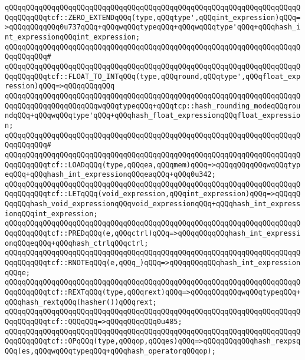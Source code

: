 \verb|qQQqqQQqqQQqqQQqqQQqqQQqqQQqqQQqqQQqqQQqqQQqqQQqqQQqqQQqqQQqqQQqqQQqqQQqqQQqqQQqtcf::ZERO_EXTENDqQQq(type,qQQqtype',qQQqint_expression)qQQq=>qQQqqQQqqQQq0u737qQQq+qQQqwqQQqtypeqQQq+qQQqwqQQqtype'qQQq+qQQqhash_int_expressionqQQqint_expression;|\newline
\verb|qQQqqQQqqQQqqQQqqQQqqQQqqQQqqQQqqQQqqQQqqQQqqQQqqQQqqQQqqQQqqQQqqQQqqQQqqQQqqQQq#|\newline
\verb|qQQqqQQqqQQqqQQqqQQqqQQqqQQqqQQqqQQqqQQqqQQqqQQqqQQqqQQqqQQqqQQqqQQqqQQqqQQqqQQqtcf::FLOAT_TO_INTqQQq(type,qQQqround,qQQqtype',qQQqfloat_expression)qQQq=>qQQqqQQqqQQq|\newline
\verb|qQQqqQQqqQQqqQQqqQQqqQQqqQQqqQQqqQQqqQQqqQQqqQQqqQQqqQQqqQQqqQQqqQQqqQQqqQQqqQQqqQQqqQQqqQQqwqQQqtypeqQQq+qQQqtcp::hash_rounding_modeqQQqroundqQQq+qQQqwqQQqtype'qQQq+qQQqhash_float_expressionqQQqfloat_expression;|\newline
\verb|qQQqqQQqqQQqqQQqqQQqqQQqqQQqqQQqqQQqqQQqqQQqqQQqqQQqqQQqqQQqqQQqqQQqqQQqqQQqqQQq#|\newline
\verb|qQQqqQQqqQQqqQQqqQQqqQQqqQQqqQQqqQQqqQQqqQQqqQQqqQQqqQQqqQQqqQQqqQQqqQQqqQQqqQQqtcf::LOADqQQq(type,qQQqea,qQQqmem)qQQq=>qQQqqQQqqQQqwqQQqtypeqQQq+qQQqhash_int_expressionqQQqeaqQQq+qQQq0u342;|\newline
\verb|qQQqqQQqqQQqqQQqqQQqqQQqqQQqqQQqqQQqqQQqqQQqqQQqqQQqqQQqqQQqqQQqqQQqqQQqqQQqqQQqtcf::LETqQQq(void_expression,qQQqint_expression)qQQq=>qQQqqQQqqQQqhash_void_expressionqQQqvoid_expressionqQQq+qQQqhash_int_expressionqQQqint_expression;|\newline
\verb|qQQqqQQqqQQqqQQqqQQqqQQqqQQqqQQqqQQqqQQqqQQqqQQqqQQqqQQqqQQqqQQqqQQqqQQqqQQqqQQqtcf::PREDqQQq(e,qQQqctrl)qQQq=>qQQqqQQqqQQqhash_int_expressionqQQqeqQQq+qQQqhash_ctrlqQQqctrl;|\newline
\verb|qQQqqQQqqQQqqQQqqQQqqQQqqQQqqQQqqQQqqQQqqQQqqQQqqQQqqQQqqQQqqQQqqQQqqQQqqQQqqQQqtcf::RNOTEqQQq(e,qQQq_)qQQq=>qQQqqQQqqQQqhash_int_expressionqQQqe;|\newline
\verb|qQQqqQQqqQQqqQQqqQQqqQQqqQQqqQQqqQQqqQQqqQQqqQQqqQQqqQQqqQQqqQQqqQQqqQQqqQQqqQQqtcf::REXTqQQq(type,qQQqrext)qQQq=>qQQqqQQqqQQqwqQQqtypeqQQq+qQQqhash_rextqQQq(hasher())qQQqrext;|\newline
\verb|qQQqqQQqqQQqqQQqqQQqqQQqqQQqqQQqqQQqqQQqqQQqqQQqqQQqqQQqqQQqqQQqqQQqqQQqqQQqqQQqtcf::QQQqQQq=>qQQqqQQqqQQq0u485;|\newline
\verb|qQQqqQQqqQQqqQQqqQQqqQQqqQQqqQQqqQQqqQQqqQQqqQQqqQQqqQQqqQQqqQQqqQQqqQQqqQQqqQQqtcf::OPqQQq(type,qQQqop,qQQqes)qQQq=>qQQqqQQqqQQqhash_rexpsqQQq(es,qQQqwqQQqtypeqQQq+qQQqhash_operatorqQQqop);|\newline
